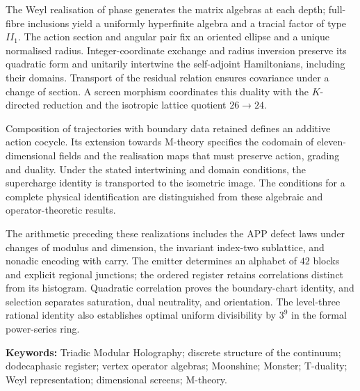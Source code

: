 The Weyl realisation of phase generates the matrix algebras at each
depth; full-fibre inclusions yield a uniformly hyperfinite algebra and
a tracial factor of type \(II_1\). The action section and angular pair
fix an oriented ellipse and a unique normalised radius. Integer-coordinate
exchange and radius inversion preserve its quadratic form and unitarily
intertwine the self-adjoint Hamiltonians, including their domains.
Transport of the residual relation ensures covariance under a change
of section. A screen morphism coordinates this duality with the
\(K\)-directed reduction and the isotropic lattice quotient \(26\to24\).

Composition of trajectories with boundary data retained defines an
additive action cocycle. Its extension towards M-theory specifies the
codomain of eleven-dimensional fields and the realisation maps that must
preserve action, grading and duality. Under the stated intertwining and
domain conditions, the supercharge identity is transported to the
isometric image. The conditions for a complete physical identification
are distinguished from these algebraic and operator-theoretic results.
\par\medskip

The arithmetic preceding these realizations includes the APP defect
laws under changes of modulus and dimension, the invariant index-two
sublattice, and nonadic encoding with carry. The emitter determines
an alphabet of \(42\) blocks and explicit regional junctions; the ordered
register retains correlations distinct from its histogram. Quadratic
correlation proves the boundary-chart identity, and selection separates
saturation, dual neutrality, and orientation. The level-three rational
identity also establishes optimal uniform divisibility by \(3^9\) in
the formal power-series ring.

\noindent\textbf{Keywords:} Triadic Modular Holography; discrete structure
of the continuum; dodecaphasic register; vertex operator algebras;
Moonshine; Monster; T-duality; Weyl representation; dimensional screens;
M-theory.
\par\endgroup
